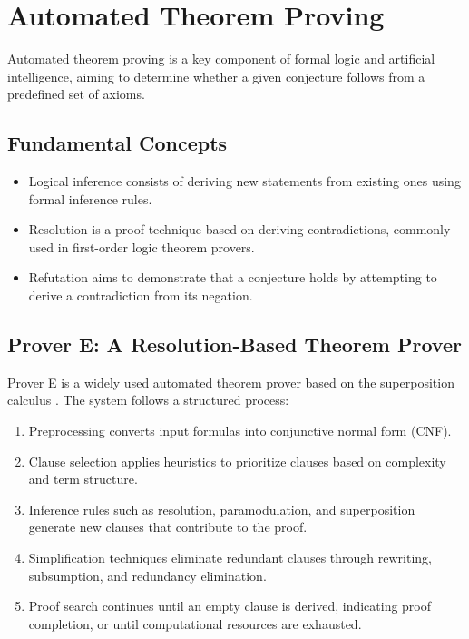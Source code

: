 \documentclass[english,version-2020-11]{uzl-thesis}
\begin{document}
\section{Automated Theorem Proving}

Automated theorem proving is a key component of formal logic and artificial intelligence, aiming to determine whether a given conjecture follows from a predefined set of axioms.

\subsection{Fundamental Concepts}
\begin{itemize}
    \item Logical inference consists of deriving new statements from existing ones using formal inference rules.
    \item Resolution is a proof technique based on deriving contradictions, commonly used in first-order logic theorem provers.
    \item Refutation aims to demonstrate that a conjecture holds by attempting to derive a contradiction from its negation.
\end{itemize}

\subsection{Prover E: A Resolution-Based Theorem Prover}
Prover E is a widely used automated theorem prover based on the superposition calculus \cite{Schulz2013}. The system follows a structured process:

\begin{enumerate}
    \item Preprocessing converts input formulas into conjunctive normal form (CNF).
    \item Clause selection applies heuristics to prioritize clauses based on complexity and term structure.
    \item Inference rules such as resolution, paramodulation, and superposition generate new clauses that contribute to the proof.
    \item Simplification techniques eliminate redundant clauses through rewriting, subsumption, and redundancy elimination.
    \item Proof search continues until an empty clause is derived, indicating proof completion, or until computational resources are exhausted.
\end{enumerate}
\end{document}
